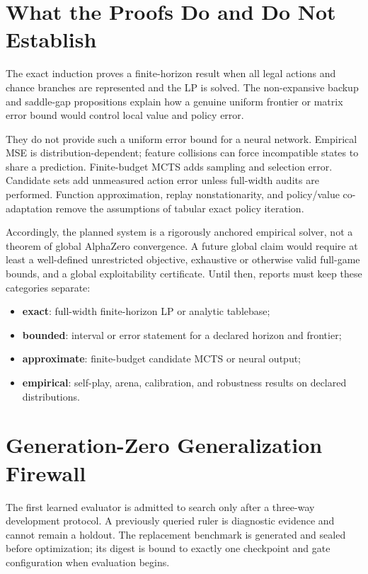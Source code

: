 \documentclass[11pt]{article}
\begin{document}
\section{What the Proofs Do and Do Not Establish}

The exact induction proves a finite-horizon result when all legal actions and
chance branches are represented and the LP is solved. The non-expansive backup
and saddle-gap propositions explain how a genuine uniform frontier or matrix
error bound would control local value and policy error.

They do not provide such a uniform error bound for a neural network. Empirical
MSE is distribution-dependent; feature collisions can force incompatible
states to share a prediction. Finite-budget MCTS adds sampling and selection
error. Candidate sets add unmeasured action error unless full-width audits are
performed. Function approximation, replay nonstationarity, and policy/value
co-adaptation remove the assumptions of tabular exact policy iteration.

Accordingly, the planned system is a rigorously anchored empirical solver, not
a theorem of global AlphaZero convergence. A future global claim would require
at least a well-defined unrestricted objective, exhaustive or otherwise valid
full-game bounds, and a global exploitability certificate. Until then, reports
must keep these categories separate:

\begin{itemize}[leftmargin=*]
  \item \textbf{exact}: full-width finite-horizon LP or analytic tablebase;
  \item \textbf{bounded}: interval or error statement for a declared horizon
        and frontier;
  \item \textbf{approximate}: finite-budget candidate MCTS or neural output;
  \item \textbf{empirical}: self-play, arena, calibration, and robustness
        results on declared distributions.
\end{itemize}

\section{Generation-Zero Generalization Firewall}

The first learned evaluator is admitted to search only after a three-way
development protocol.  A previously queried ruler is diagnostic evidence and
cannot remain a holdout.  The replacement benchmark is generated and sealed
before optimization; its digest is bound to exactly one checkpoint and gate
configuration when evaluation begins.
\end{document}

